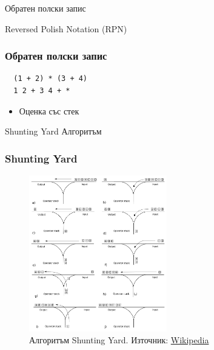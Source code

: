 \documentclass{beamer}
\begin{document}
\begin{frame}
  \centerline{Обратен полски запис}
  \centerline{Reversed Polish Notation (RPN)}
  \end{frame}
  
  \begin{frame}[fragile]
  \frametitle{Обратен полски запис}

  

  \begin{verbatim}
  (1 + 2) * (3 + 4)
  1 2 + 3 4 + *  
  \end{verbatim}
  
  \begin{itemize}
    \item Оценка със стек
  \end{itemize}
  
  \end{frame}
  
  

\begin{frame}
\centerline{Shunting Yard Алгоритъм}
\end{frame}


\begin{frame}[fragile]
  \frametitle{Shunting Yard}
  \begin{figure}
    \centering
    \includegraphics[width=6cm]{images/shunting_yard}
    \caption{Алгоритъм Shunting Yard. Източник: \href{https://en.wikipedia.org/wiki/Shunting-yard_algorithm}{Wikipedia}}
    \label{fig:syard}
    \end{figure}  
\end{frame}
  
\end{document}
